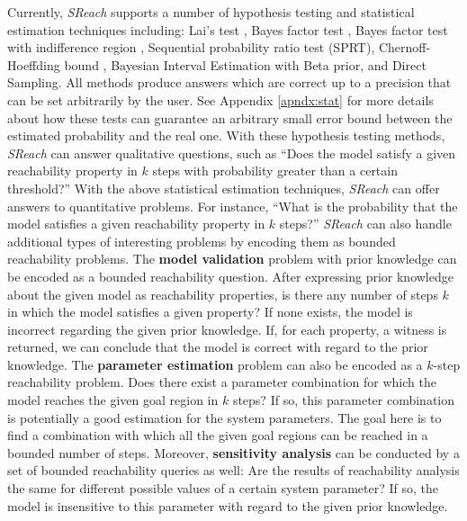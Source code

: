 Currently, {\it SReach} supports a number of hypothesis testing and statistical estimation techniques including: {Lai's test} \cite{lai1988nearly}, {Bayes factor test} \cite{kass1995bayes}, {Bayes factor test with indifference region} \cite{younes2005verification}, {Sequential probability ratio test (SPRT)}\cite{wald1945sequential}, {Chernoff-Hoeffding bound} \cite{hoeffding1963probability}, {Bayesian Interval Estimation with Beta prior}\cite{zuliani2010bayesian}, and {Direct Sampling}. All methods produce answers which are correct up to a precision that can be set arbitrarily by the user. See Appendix \ref{apndx:stat} for more details about how these tests can guarantee an arbitrary small error bound between the estimated probability and the real one. With these hypothesis testing methods, {\it SReach} can answer qualitative questions, such as ``Does the model satisfy a given reachability property in $k$ steps with probability greater than a certain threshold?'' With the above statistical estimation techniques, {\it SReach} can offer answers to quantitative problems. For instance, ``What is the probability that the model satisfies a given reachability property in $k$ steps?''  {\it SReach} can also handle additional types of interesting problems by encoding them as bounded reachability problems. The {\bf model validation} problem with prior knowledge can be encoded as a bounded reachability question. After expressing prior knowledge about the given model as reachability properties, is there any number of steps $k$ in which the model satisfies a given property? If none exists, the model is incorrect regarding the given prior knowledge. If, for each property, a witness is returned, we can conclude that the model is correct with regard to the prior knowledge. The {\bf parameter estimation} problem can also be encoded as a $k$-step reachability problem. Does there exist a parameter combination for which the model reaches the given goal region in $k$ steps? If so, this parameter combination is potentially a good estimation for the system parameters. The goal here is to find a combination with which all the given goal regions can be reached in a bounded number of steps. Moreover, {\bf sensitivity analysis} can be conducted by a set of bounded reachability queries as well: Are the results of reachability analysis the same for different possible values of a certain system parameter? If so, the model is insensitive to this parameter with regard to the given prior knowledge.


